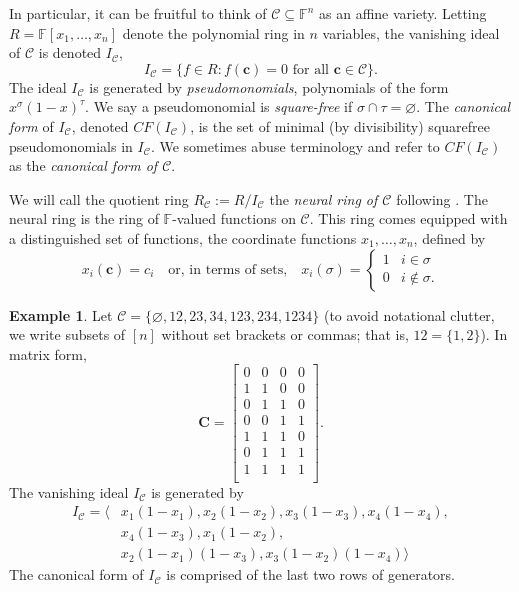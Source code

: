 \documentclass[11pt,letterpaper, reqno]{amsart}
\theoremstyle{definition}
\newtheorem{ex}[thm]{Example}        %
\def\F{\mathbb{F}}
\def\bc{\mathbf{c}}
\def\bC{\mathbf{C}}
\def\cC{\mathcal{C}}
\begin{document}
        In particular, 
        it can be fruitful to think of $\cC \subseteq \F^n$ as an affine variety. Letting $R = \F[x_1,\dots,x_n]$ denote the polynomial ring in $n$ variables, the vanishing ideal of $\cC$ is denoted $I_\cC$,
            \[ I_\cC = \{ f \in R : f(\bc) = 0 \text{ for all } \bc \in \cC\}. \]
        The ideal $I_\cC$ is generated by \emph{pseudomonomials}, polynomials of the form $x^\sigma(1-x)^\tau$. We say a pseudomonomial is \emph{square-free} if $\sigma \cap \tau = \varnothing$. The \emph{canonical form} of $I_\cC$, denoted $CF(I_\cC)$, is the set of minimal (by divisibility) squarefree pseudomonomials in $I_\cC$.
        We sometimes abuse terminology and refer to $CF(I_\cC)$ as the \emph{canonical form of $\cC$}.
     
        
        We will call the quotient ring $R_\cC := R / I_\cC$ the \emph{neural ring of $\cC$} following \cite{neuralring13}.
        The neural ring is the ring of $\F$-valued functions on $\cC$.
        This ring comes equipped with a distinguished set of functions, the coordinate functions $x_1,\dots,x_n$, defined by
            \[ x_i(\bc) = c_i \quad \text{or, in terms of sets,}\quad x_i(\sigma) = \begin{cases}
                1 & i\in\sigma\\
                0 & i\notin\sigma.
            \end{cases} \]

        \begin{ex}\label{ex:standard1}
            Let $\cC = \{\varnothing, 12,23,34,123,234,1234\}$ (to avoid notational clutter, we write subsets of $[n]$ without set brackets or commas; that is, $12 = \{1,2\}$). In matrix form,
                \[ \bC = \begin{bmatrix}
                    0 & 0 & 0 & 0\\
                    1 & 1 & 0 & 0\\
                    0 & 1 & 1 & 0\\
                    0 & 0 & 1 & 1\\
                    1 & 1 & 1 & 0\\
                    0 & 1 & 1 & 1\\
                    1 & 1 & 1 & 1\\
                \end{bmatrix}
                .
                \]
            The vanishing ideal $I_\cC$ is generated by
            \begin{align*}
                I_\cC = \langle & x_1(1-x_1), x_2(1-x_2), x_3(1-x_3), x_4(1-x_4),\\
                    & x_4 (1 - x_3), x_1 (1 - x_2), \\
                    & x_2 (1 - x_1) (1 - x_3), x_3 (1 - x_2) (1 - x_4) \rangle
            \end{align*}
            The canonical form of $I_\cC$ is comprised of the last two rows of generators.
        \end{ex}
    
\end{document}
